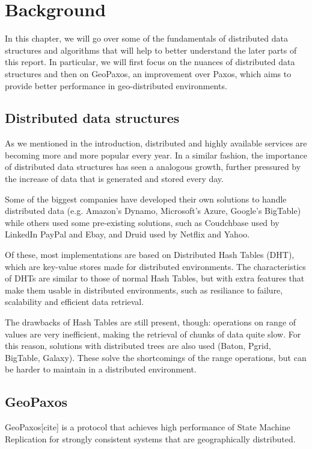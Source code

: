 \chapter{Background}\label{sec:Background}
In this chapter, we will go over some of the fundamentals of distributed data structures and algorithms that will help to better understand the later parts of this report. In particular, we will first focus on the nuances of distributed data structures and then on  GeoPaxos, an improvement over Paxos, which aims to provide better performance in geo-distributed environments.

\section{Distributed data structures}\label{sec:distributed-data-structures}
As we mentioned in the introduction, distributed and highly available services are becoming more and more popular every year. In a similar fashion, the importance of distributed data structures has seen a analogous growth, further pressured by the increase of data that is generated and stored every day. 

Some of the biggest companies have developed their own solutions to handle distributed data (e.g. Amazon's Dynamo, Microsoft's Azure, Google's BigTable) while others used some pre-existing solutions, such as Coudchbase used by LinkedIn PayPal and Ebay, and Druid used by Netflix and Yahoo.

Of these, most implementations are based on Distributed Hash Tables (DHT), which are key-value stores made for distributed environments.
The characteristics of DHTs are similar to those of normal Hash Tables, but with extra features that make them usable in distributed environments, such as resiliance to failure, scalability and efficient data retrieval.

The drawbacks of Hash Tables are still present, though: operations on range of values are very inefficient, making the retrieval of chunks of data quite slow. For this reason, solutions with distributed trees are also used (Baton, Pgrid, BigTable, Galaxy). These solve the shortcomings of the range operations, but can be harder to maintain in a distributed environment.

\section{GeoPaxos}\label{sec:GeoPaxos}
GeoPaxos[cite] is a protocol that achieves high performance of State Machine Replication for strongly consistent systems that are geographically distributed.


